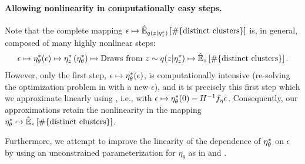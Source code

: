 \paragraph{Allowing nonlinearity in computationally easy steps.}
%
Note that the complete mapping
$\epsilon \mapsto \hat{\mathbb{E}}_{{q(z \vert \eta_z^{*})}}
\left[ \#\{\text{distinct clusters}\} \right]$
is, in general, composed of many highly nonlinear steps:
%
\begin{align*}
\epsilon \mapsto
\eta_\theta^{*}(\epsilon) \mapsto
\eta_z^{*}\left(\eta_\theta^{*}\right) \mapsto
\textrm{Draws from }z \sim q(z \vert \eta_z^{*}) \mapsto
\hat{\mathbb{E}}_z \left[ \#\{\text{distinct clusters}\} \right].
\end{align*}
%
However, only the first step, $\epsilon \mapsto \eta_\theta^{*}(\epsilon)$, is
computationally intensive (re-solving the optimization problem in
 with a new $\epsilon$), and it is precisely
this first step which we approximate linearly using
, i.e., with $\epsilon \mapsto \eta_\theta^{*}(0) -
H^{-1} f_\eta \epsilon$. Consequently, our approximations retain the
nonlinearity in the mapping $\eta_\theta^{*} \mapsto \hat{\mathbb{E}}_z \left[
\#\{\text{distinct clusters}\} \right]$.

Furthermore, we attempt to improve the linearity of the dependence of
$\eta_\theta^{*}$ on $\epsilon$ by using an unconstrained parameterization for
$\eta_\theta$ as in \citet{stan-manual:2015} and \citet{kucukelbir:2015:advi}.
